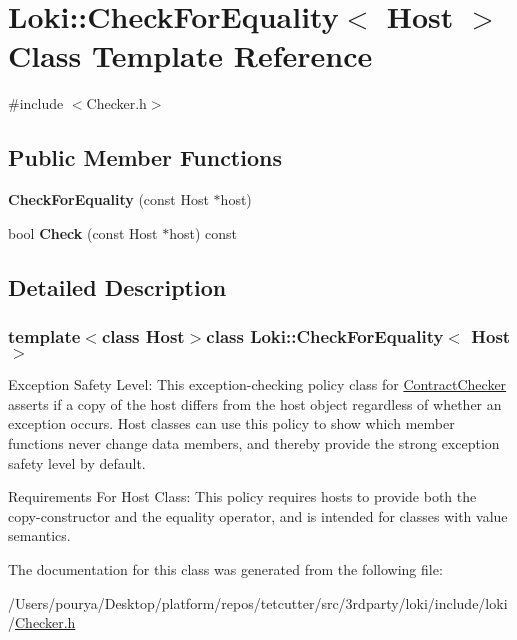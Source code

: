 \hypertarget{classLoki_1_1CheckForEquality}{}\section{Loki\+:\+:Check\+For\+Equality$<$ Host $>$ Class Template Reference}
\label{classLoki_1_1CheckForEquality}


{\ttfamily \#include $<$Checker.\+h$>$}

\subsection*{Public Member Functions}
\begin{DoxyCompactItemize}
\item 
\hypertarget{classLoki_1_1CheckForEquality_ac518288cb7d375ccfee0e6c1a458a03b}{}{\bfseries Check\+For\+Equality} (const Host $\ast$host)\label{classLoki_1_1CheckForEquality_ac518288cb7d375ccfee0e6c1a458a03b}

\item 
\hypertarget{classLoki_1_1CheckForEquality_a245d71a17c41e3950ed00bbf808828bb}{}bool {\bfseries Check} (const Host $\ast$host) const \label{classLoki_1_1CheckForEquality_a245d71a17c41e3950ed00bbf808828bb}

\end{DoxyCompactItemize}


\subsection{Detailed Description}
\subsubsection*{template$<$class Host$>$class Loki\+::\+Check\+For\+Equality$<$ Host $>$}

\begin{DoxyParagraph}{Exception Safety Level\+:}
This exception-\/checking policy class for \hyperlink{classLoki_1_1ContractChecker}{Contract\+Checker} asserts if a copy of the host differs from the host object regardless of whether an exception occurs. Host classes can use this policy to show which member functions never change data members, and thereby provide the strong exception safety level by default.
\end{DoxyParagraph}
\begin{DoxyParagraph}{Requirements For Host Class\+:}
This policy requires hosts to provide both the copy-\/constructor and the equality operator, and is intended for classes with value semantics. 
\end{DoxyParagraph}


The documentation for this class was generated from the following file\+:\begin{DoxyCompactItemize}
\item 
/\+Users/pourya/\+Desktop/platform/repos/tetcutter/src/3rdparty/loki/include/loki/\hyperlink{Checker_8h}{Checker.\+h}\end{DoxyCompactItemize}
